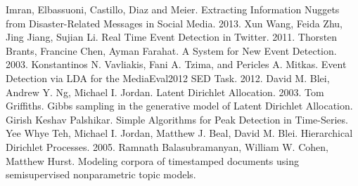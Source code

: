 \documentclass[12pt, a4paper]{article}
\begin{document}
\begin{thebibliography}{9}
	Imran, Elbassuoni, Castillo, Diaz and Meier.
	Extracting Information Nuggets from Disaster-Related Messages in Social Media.
	2013.
	Xun Wang, Feida Zhu, Jing Jiang, Sujian Li.
	Real Time Event Detection in Twitter.
	2011.
	Thorsten Brants, Francine Chen, Ayman Farahat.
	A System for New Event Detection.
	2003.
	Konstantinos N. Vavliakis, Fani A. Tzima, and Pericles A. Mitkas.	
	Event Detection via LDA for the MediaEval2012 SED Task.
	2012.
	David M. Blei, Andrew Y. Ng, Michael I. Jordan.
	Latent Dirichlet Allocation.
	2003.
	Tom Griffiths.
	Gibbs sampling in the generative model of Latent Dirichlet Allocation.
	Girish Keshav Palshikar.
	Simple Algorithms for Peak Detection in Time-Series.
	Yee Whye Teh, Michael I. Jordan, Matthew J. Beal, David M. Blei.
	Hierarchical Dirichlet Processes.
	2005.
	Ramnath Balasubramanyan, William W. Cohen, Matthew Hurst.
	Modeling corpora of timestamped documents using semisupervised nonparametric topic models.
		
\end{thebibliography}
  
\end{document}
